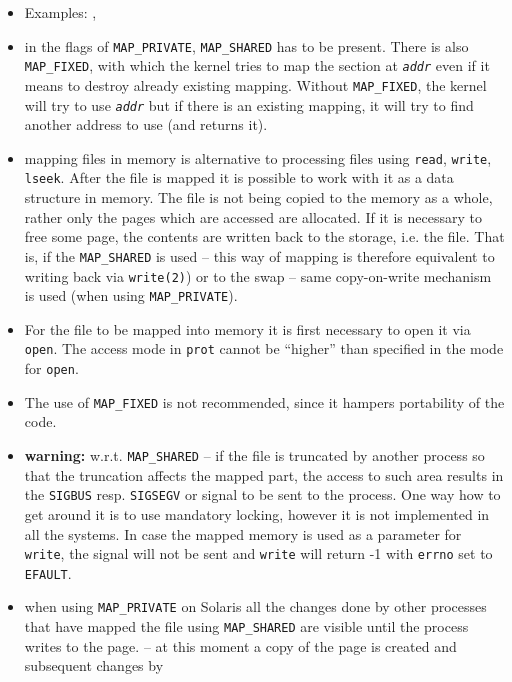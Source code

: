 \begin{itemize}
\setlength{\itemsep}{0.8\itemsep}
\item Examples: , 
\item in the flags  of \texttt{MAP\_PRIVATE},
\texttt{MAP\_SHARED} has to be present.
There is also \texttt{MAP\_FIXED}, with which the
kernel tries to map the section at \emph{\texttt{addr}} even if it means to
destroy already existing mapping.  Without \texttt{MAP\_FIXED}, the kernel
will try to use \emph{\texttt{addr}} but if there is an existing mapping, it
will try to find another address to use (and returns it).
\item mapping files in memory is alternative to processing files using
\texttt{read}, \texttt{write}, \texttt{lseek}.  After the file is mapped it is
possible to work with it as a data structure in memory. The file is not being
copied to the memory as a whole, rather only the pages which are accessed are
allocated. If it is necessary to free some page, the contents are written back
to the storage, i.e. the file. That is, if the \texttt{MAP\_SHARED} is used
-- this way of mapping is therefore equivalent to writing back via
\texttt{write(2)}) or to the swap -- same copy-on-write mechanism is used
(when using \texttt{MAP\_PRIVATE}).
\item For the file to be mapped into memory it is first necessary to open it
via \texttt{open}. The access mode in \texttt{prot} cannot be ``higher'' than
specified in the mode for \texttt{open}.
\item The use of \texttt{MAP\_FIXED} is not recommended, since it hampers
portability of the code.
\item \textbf{warning:} w.r.t. \texttt{MAP\_SHARED} -- if the file is truncated
by another process so that the truncation affects the mapped part, the access
to such area results in the \texttt{SIGBUS} resp. \texttt{SIGSEGV} or signal
to be sent to the process. One way how to get around it is to use
mandatory locking, however it is not implemented in all the systems.
In case the mapped memory is used as a parameter for \texttt{write},
the signal will not be sent and \texttt{write} will return -1
with \texttt{errno} set to \texttt{EFAULT}.
\item when using \texttt{MAP\_PRIVATE} on Solaris all the changes done by other
processes that have mapped the file using \texttt{MAP\_SHARED} are visible
until the process writes to the page.
-- at this moment a copy of the page is created and subsequent changes by

\end{itemize}
